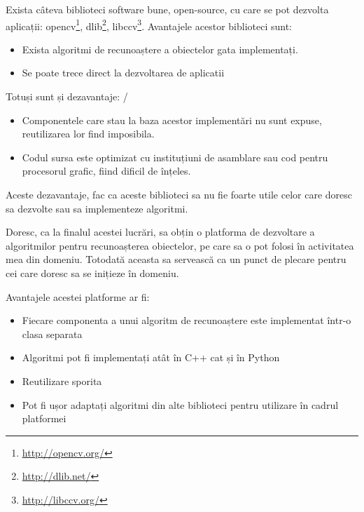 Exista câteva biblioteci software bune, open-source, cu care se pot dezvolta aplicații: 
opencv\footnote{\url{http://opencv.org/}}, 
dlib\footnote{\url{http://dlib.net/}}, 
libccv\footnote{\url{http://libccv.org/}}.
Avantajele acestor biblioteci sunt:
\begin{itemize}
	\item Exista algoritmi de recunoaștere a obiectelor gata implementați.
	\item Se poate trece direct la dezvoltarea de aplicatii
\end{itemize}
Totuși sunt și dezavantaje:
/\begin{itemize}
	\item Componentele care stau la baza acestor implementări nu sunt expuse, reutilizarea lor find imposibila.
	\item Codul sursa este optimizat cu instituțiuni de asamblare sau cod pentru procesorul grafic, fiind dificil de înțeles.
\end{itemize}
Aceste dezavantaje, fac ca aceste biblioteci sa nu fie foarte utile celor care doresc sa dezvolte sau sa implementeze algoritmi.

Doresc, ca la finalul acestei lucrări, sa obțin o platforma de dezvoltare a algoritmilor pentru recunoașterea obiectelor, pe care sa o pot folosi în activitatea mea din domeniu.
Totodată aceasta sa servească ca un punct de plecare pentru cei care doresc sa se inițieze în domeniu.

Avantajele acestei platforme ar fi:
\begin{itemize}
	\item Fiecare componenta a unui algoritm de recunoaștere este implementat într-o clasa separata
	\item Algoritmi pot fi implementați atât în C++ cat și în Python
	\item Reutilizare sporita
	\item Pot fi ușor adaptați algoritmi din alte biblioteci pentru utilizare în cadrul platformei
\end{itemize}



